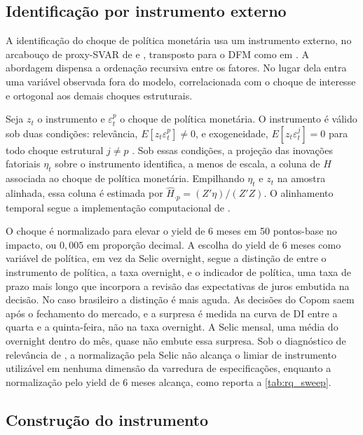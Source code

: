 \documentclass[preprint,authoryear,review,12pt]{elsarticle}
\begin{document}
\subsection{Identificação por instrumento externo}

A identificação do choque de política monetária usa um instrumento externo, no arcabouço de proxy-SVAR de \cite{stockwatson2018} e \cite{gertler2015}, transposto para o DFM como em \cite{alessi}. A abordagem dispensa a ordenação recursiva entre os fatores. No lugar dela entra uma variável observada fora do modelo, correlacionada com o choque de interesse e ortogonal aos demais choques estruturais.

Seja $z_t$ o instrumento e $\varepsilon_t^{p}$ o choque de política monetária. O instrumento é válido sob duas condições: relevância, $E[z_t \varepsilon_t^{p}] \neq 0$, e exogeneidade, $E[z_t \varepsilon_t^{j}] = 0$ para todo choque estrutural $j \neq p$ \cite{stockwatson2018}. Sob essas condições, a projeção das inovações fatoriais $\eta_t$ sobre o instrumento identifica, a menos de escala, a coluna de $H$ associada ao choque de política monetária. Empilhando $\eta_t$ e $z_t$ na amostra alinhada, essa coluna é estimada por $\hat{H}_{\cdot p} = (Z'\eta)/(Z'Z)$. O alinhamento temporal segue a implementação computacional de \cite{alessi}.

O choque é normalizado para elevar o yield de 6 meses em 50 pontos-base no impacto, ou $0{,}005$ em proporção decimal. A escolha do yield de 6 meses como variável de política, em vez da Selic overnight, segue a distinção de \cite{gertler2015} entre o instrumento de política, a taxa overnight, e o indicador de política, uma taxa de prazo mais longo que incorpora a revisão das expectativas de juros embutida na decisão. No caso brasileiro a distinção é mais aguda. As decisões do Copom saem após o fechamento do mercado, e a surpresa é medida na curva de DI entre a quarta e a quinta-feira, não na taxa overnight. A Selic mensal, uma média do overnight dentro do mês, quase não embute essa surpresa. Sob o diagnóstico de relevância de \cite{montielolea}, a normalização pela Selic não alcança o limiar de instrumento utilizável em nenhuma dimensão da varredura de especificações, enquanto a normalização pelo yield de 6 meses alcança, como reporta a \autoref{tab:rq_sweep}.

\subsection{Construção do instrumento}
\end{document}
